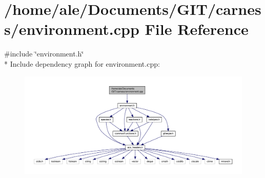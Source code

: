 \hypertarget{a00079}{\section{/home/ale/\-Documents/\-G\-I\-T/carness/environment.cpp File Reference}
\label{a00079}
}
{\ttfamily \#include \char`\"{}environment.\-h\char`\"{}}\\*
Include dependency graph for environment.\-cpp\-:\nopagebreak
\begin{figure}[H]
\begin{center}
\leavevmode
\includegraphics[width=350pt]{a00126}
\end{center}
\end{figure}
